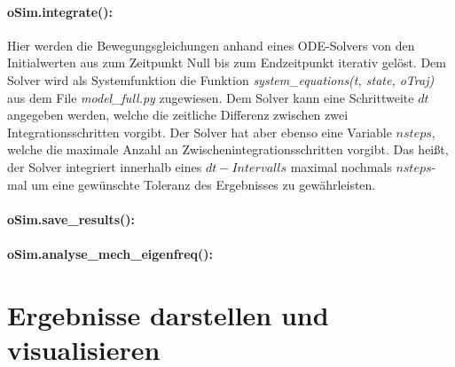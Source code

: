\documentclass[10pt,a4paper]{article}
\newcommand{\cbox}[1]{\colorbox{green!50!black!30}{#1}}
\begin{document}
		\paragraph{\cbox{oSim.integrate():}}
			Hier werden die Bewegungsgleichungen anhand eines ODE-Solvers von den Initialwerten aus zum Zeitpunkt Null bis zum Endzeitpunkt iterativ gelöst. Dem Solver wird als Systemfunktion die Funktion \textit{system\_equations(t, state, oTraj)} aus dem File \textit{model\_full.py} zugewiesen. Dem Solver kann eine Schrittweite $ dt $ angegeben werden, welche die zeitliche Differenz zwischen zwei Integrationsschritten vorgibt. Der Solver hat aber ebenso eine Variable $ nsteps $, welche die maximale Anzahl an Zwischenintegrationsschritten vorgibt. Das heißt, der Solver integriert innerhalb eines $ dt-Intervalls $ maximal nochmals $ nsteps $-mal um eine gewünschte Toleranz des Ergebnisses zu gewährleisten. 
		\paragraph{\cbox{oSim.save\_results():}}
		\paragraph{\cbox{oSim.analyse\_mech\_eigenfreq():}}
	
	\section{Ergebnisse darstellen und visualisieren}
\end{document}
